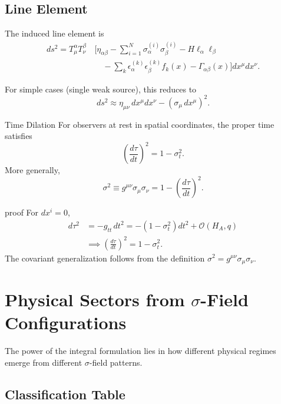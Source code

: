 \documentclass[11pt,a4paper]{article}
\theoremstyle{definition}
\theoremstyle{remark}
\begin{document}
		\subsection{Line Element}
		
		The induced line element is
		\begin{equation}
			\begin{aligned}
				ds^2 = T^\alpha_\mu T^\beta_\nu \, &\Bigg[\eta_{\alpha\beta} - \sum_{i=1}^{N} \sigma_\alpha^{(i)} \sigma_\beta^{(i)} - H \ell_\alpha \ell_\beta\\
				&\quad - \sum_{k} \epsilon_\alpha^{(k)} \epsilon_\beta^{(k)} f_k(x) - \Gamma_{\alpha\beta}(x)\Bigg] dx^\mu dx^\nu.
			\end{aligned}
		\end{equation}
		
		For simple cases (single weak source), this reduces to
		\begin{equation}
			ds^2 \approx \eta_{\mu\nu} \, dx^\mu dx^\nu - (\sigma_\mu \, dx^\mu)^2.
		\end{equation}
	
	Time Dilation
		For observers at rest in spatial coordinates, the proper time satisfies
		\begin{equation}
			\left(\frac{d\tau}{dt}\right)^2 = 1 - \sigma_t^2.
		\end{equation}
		More generally,
		\begin{equation}
			\boxed{\sigma^2 \equiv g^{\mu\nu}\sigma_\mu\sigma_\nu = 1 - \left(\frac{d\tau}{dt}\right)^2.}
		\end{equation}
	
	proof
		For $dx^i = 0$,
		\begin{align}
			d\tau^2 &= -g_{tt} \, dt^2 = -(1 - \sigma_t^2) dt^2 + \mathcal{O}(H_A, q)\\
			&\implies \left(\frac{d\tau}{dt}\right)^2 = 1 - \sigma_t^2.
		\end{align}
		The covariant generalization follows from the definition $\sigma^2 = g^{\mu\nu}\sigma_\mu\sigma_\nu$.
	
	\section{Physical Sectors from $\sigma$-Field Configurations}
	
	The power of the integral formulation lies in how different physical regimes emerge from different $\sigma$-field patterns.
	
	\subsection{Classification Table}
	
\end{document}
